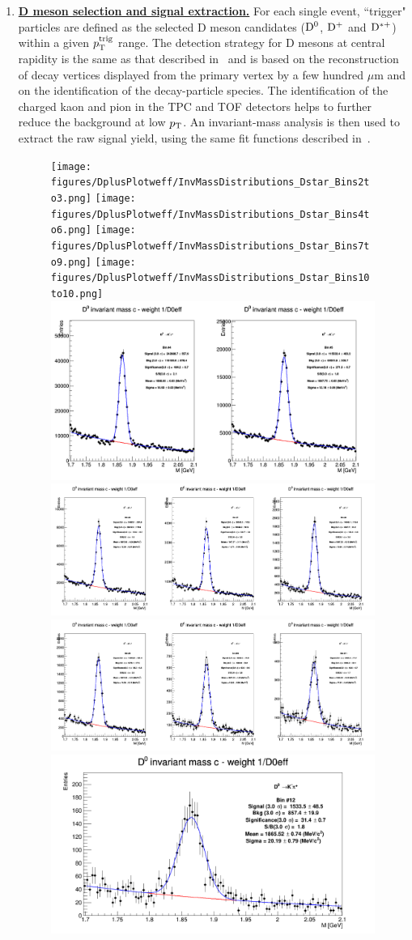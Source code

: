 \begin{enumerate}

\item
\underline {\bf D meson selection and signal extraction.}  For each single event, ``trigger" particles
are defined as the selected  D meson candidates (${\rm D^0}$, ${\rm D^+}$ and ${\rm D^{*+}}$)
within a given $p_{\rm T}^{\rm trig}$ range. The detection strategy for D mesons at central rapidity is
the same as that described in~\cite{ALICEDmespp7Tev} and is based on the reconstruction of decay
vertices displayed from the primary vertex by a few hundred $\mu$m and on the identification of the decay-particle species.
The identification of the charged kaon and pion in the TPC and TOF
detectors helps to further reduce the background at low $p_{\rm T}$.  An
invariant-mass analysis is then used to extract the raw signal yield, using
the same fit functions described in~\cite{ALICEDmespp7Tev}.


\begin{figure}[h]
\centering
{\texttt{[image: figures/DplusPlotweff/InvMassDistributions\_Dstar\_Bins2to3.png]}}
{\texttt{[image: figures/DplusPlotweff/InvMassDistributions\_Dstar\_Bins4to6.png]}}
{\texttt{[image: figures/DplusPlotweff/InvMassDistributions\_Dstar\_Bins7to9.png]}}
{\texttt{[image: figures/DplusPlotweff/InvMassDistributions\_Dstar\_Bins10to10.png]}}
{\includegraphics[width=.32\linewidth]{figures/Dzero/InvMassDistributions_Dzero_Bins4to5.png}}
{\includegraphics[width=.32\linewidth]{figures/Dzero/InvMassDistributions_Dzero_Bins6to8.png}}
{\includegraphics[width=.32\linewidth]{figures/Dzero/InvMassDistributions_Dzero_Bins9to11.png}}
{\includegraphics[width=.32\linewidth]{figures/Dzero/InvMassDistributions_Dzero_Bins12to12.png}}




\end{figure}
\end{enumerate}
